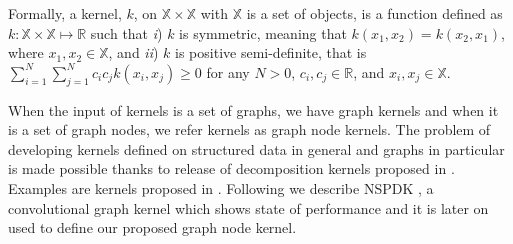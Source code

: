 \documentclass[review]{elsarticle}
\begin{document}
Formally, a kernel, $k$, on $\mathbb{X} \times \mathbb{X}$ with $\mathbb{X}$ is a set of objects, is a function defined as $k: \mathbb{X} \times \mathbb{X}\longmapsto \mathbb{R}$ such that \textit{i}) $k$ is symmetric, meaning that $k(x_1,x_2) = k(x_2,x_1)$, where $x_1, x_2 \in \mathbb{X}$, and \textit{ii}) $k$ is positive semi-definite, that is $\sum_{i=1}^{N}\sum_{j=1}^{N} c_i c_jk(x_i,x_j) \geq 0$ for any $N>0$, $c_i, c_j \in \mathbb{R}$, and  $x_i, x_j \in \mathbb{X}$.

When the input of kernels is a set of graphs, we have graph kernels and when it is a set of graph nodes, we refer kernels as graph node kernels.
The problem of developing kernels defined on structured data in general and graphs in particular is made possible thanks to release of decomposition kernels proposed in \cite{haussler1999convolution}. Examples are kernels proposed in \cite{shervashidze2011weisfeiler, gartner2003survey, borgwardt2005shortest, costa2010fast}. Following we describe NSPDK \cite{costa2010fast}, a convolutional graph kernel which shows state of performance and it is later on used to define our proposed graph node kernel.
\end{document}
